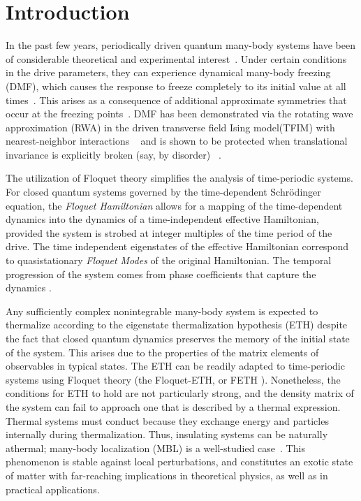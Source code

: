 \documentclass[%
reprint,
superscriptaddress,
amsmath,amssymb,
aps,
prb,
showkeys,
]{revtex4-2}
\begin{document}
\section{\label{sec:introduction} Introduction}
In the past few years, periodically driven quantum many-body systems have been of considerable theoretical and experimental interest~\cite{bordia_periodically_2017, sahoo_periodically_2019}. Under certain conditions in the drive parameters, they can experience dynamical many-body freezing (DMF), which causes the response to freeze completely to its initial value at all times~\cite{das_exotic_2010, sirshendu:freezing, asmi:floquet:thermalization}. This arises as a consequence of additional approximate symmetries that occur at the freezing points~\cite{asmi:scars}. DMF has been demonstrated via the rotating wave approximation (RWA) in the driven transverse field Ising model(TFIM) with nearest-neighbor interactions ~\cite{mbeng_quantum_2020} and is shown to be protected when translational invariance is explicitly broken (say, by disorder) ~\cite{yamada_localization_2022, roy_fate_2015}. 

The utilization of Floquet theory simplifies the analysis of time-periodic systems. For closed quantum systems governed by the time-dependent Schr\"odinger equation, the \textit{Floquet Hamiltonian} allows for a mapping of the time-dependent dynamics into the dynamics of 	
a time-independent effective Hamiltonian, provided the system is strobed at integer multiples of the time period of the drive. The time independent eigenstates of the effective Hamiltonian correspond to quasistationary \textit{Floquet Modes} of the original Hamiltonian. The temporal progression of the system comes from  phase coefficients that capture the dynamics \cite{li_floquet_2018,eckardt_high_frequency_2015}.	

Any sufficiently complex nonintegrable many-body system is expected to thermalize according to the eigenstate thermalization hypothesis (ETH) despite the fact that closed quantum dynamics preserves the memory of the initial state of the system. This arises due to the properties of the matrix elements of observables 
in typical states\cite{zhang_floquet_2016}. The ETH can be readily adapted to time-periodic systems using Floquet theory (the Floquet-ETH, or FETH \cite{Mori_2018, Kim_2014, Mizuta_2020, Mori_2023_1}). Nonetheless, the conditions for ETH to hold are not particularly strong, and the density matrix of the system can fail to approach one that is described by a thermal expression.  Thermal systems must conduct because they exchange energy and particles internally during thermalization. Thus, insulating systems can be naturally athermal;  many-body localization (MBL) is a well-studied case~\cite{khemani_phase_2016}. This phenomenon is stable against local perturbations, and constitutes an exotic state of matter with far-reaching implications in theoretical physics, as well as in practical applications\cite{yunger_halpern_quantum_2019}.
\end{document}
